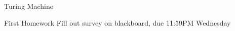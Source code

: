 \documentclass[xcolor={dvipsnames}]{beamer}
\begin{document}
\begin{frame}{Turing Machine}
	\begin{center}
	\end{center}
\end{frame}


\begin{frame}{First Homework}
Fill out survey on blackboard, due 11:59PM Wednesday
\end{frame}
\end{document}
